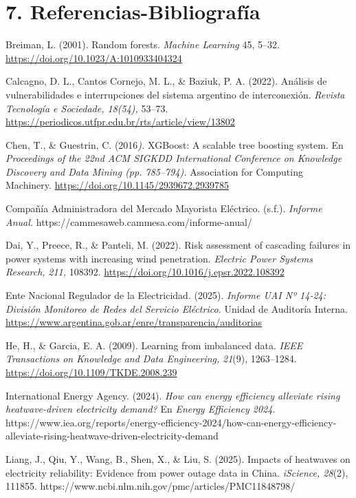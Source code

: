 \hypertarget{referencias-bibliografuxeda}{%
\section{7. Referencias-Bibliografía}\label{referencias-bibliografuxeda}}

Breiman, L. (2001). Random forests. \emph{Machine Learning} 45, 5--32. \url{https://doi.org/10.1023/A:1010933404324}

Calcagno, D. L., Cantos Cornejo, M. L., \& Baziuk, P. A. (2022). Análisis de vulnerabilidades e interrupciones del sistema argentino de interconexión. \emph{Revista Tecnología e Sociedade, 18(54),} 53--73. \url{https://periodicos.utfpr.edu.br/rts/article/view/13802}

Chen, T., \& Guestrin, C. (2016\emph{).} XGBoost: A scalable tree boosting system. En \emph{Proceedings of the 22nd ACM SIGKDD International Conference on Knowledge Discovery and Data Mining (pp. 785--794).} Association for Computing Machinery. \url{https://doi.org/10.1145/2939672.2939785}

Compañía Administradora del Mercado Mayorista Eléctrico. (s.f.). \emph{Informe Anual.} https://cammesaweb.cammesa.com/informe-anual/

Dai, Y., Preece, R., \& Panteli, M. (2022). Risk assessment of cascading failures in power systems with increasing wind penetration. \emph{Electric Power Systems Research,} \emph{211,} 108392. \url{https://doi.org/10.1016/j.epsr.2022.108392}

Ente Nacional Regulador de la Electricidad. (2025). \emph{Informe UAI Nº 14-24: División Monitoreo de Redes del Servicio Eléctrico.} Unidad de Auditoría Interna. \url{https://www.argentina.gob.ar/enre/transparencia/auditorias}

He, H., \& Garcia, E. A. (2009). Learning from imbalanced data. \emph{IEEE Transactions on Knowledge and Data Engineering,} \emph{21}(9), 1263--1284. \url{https://doi.org/10.1109/TKDE.2008.239}

International Energy Agency. (2024). \emph{How can energy efficiency alleviate rising heatwave-driven electricity demand?} En \emph{Energy Efficiency 2024}. https://www.iea.org/reports/energy-efficiency-2024/how-can-energy-efficiency-alleviate-rising-heatwave-driven-electricity-demand

Liang, J., Qiu, Y., Wang, B., Shen, X., \& Liu, S. (2025). Impacts of heatwaves on electricity reliability: Evidence from power outage data in China. \emph{iScience, 28}(2), 111855. https://www.ncbi.nlm.nih.gov/pmc/articles/PMC11848798/

